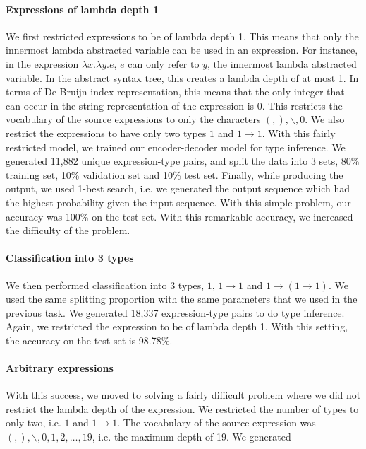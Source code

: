 \documentclass[twocolumn,9pt]{article}
\theoremstyle{definition}
\theoremstyle{remark}
\numberwithin{equation}{section}
\newcommand\TyArr[2]{#1\to{#2}}
\begin{document}
\paragraph{Expressions of lambda depth 1}
We first restricted expressions to be of lambda depth 1. This means that
only the innermost lambda abstracted variable can be used in an expression.
For instance, in the expression $\lambda x. \lambda y. e$, $e$ can only
refer to $y$, the innermost lambda abstracted variable. In the abstract
syntax tree, this creates a lambda depth of at most 1. In terms of De Bruijn
index representation, this means that the only integer that can occur in
the string representation of the expression is 0. This restricts the vocabulary
of the source expressions to only the characters $(, ), \backslash, 0$.
We also restrict the expressions to have only two types $1$ and $\TyArr{1}{1}$.
With this fairly restricted model, we trained our encoder-decoder model for
type inference. We generated 11,882 unique expression-type pairs, and split the
data into 3 sets, 80\% training set, 10\% validation set and 10\% test set.
Finally, while producing the output, we used 1-best search, i.e. we generated
the output sequence which had the highest probability given the input
sequence. With this simple problem, our accuracy was 100\% on the test
set. With this remarkable accuracy, we increased the difficulty of the problem.

\paragraph{Classification into 3 types}
We then performed classification into 3 types, $1$, $\TyArr{1}{1}$ and
$\TyArr{1}{(\TyArr{1}{1})}$. We used the same splitting proportion with
the same parameters that we used in the previous task. We generated
18,337 expression-type pairs to do type inference. Again, we restricted
the expression to be of lambda depth 1. With this setting, the accuracy
on the test set is 98.78\%.

\paragraph{Arbitrary expressions}
With this success, we moved to solving a fairly difficult problem where
we did not restrict the lambda depth of the expression. We restricted the
number of types to only two, i.e. $1$ and $\TyArr{1}{1}$. The vocabulary
of the source expression was $(, ), \backslash, 0, 1, 2, \ldots, 19$, i.e.
the maximum depth of 19. We generated 
\end{document}
